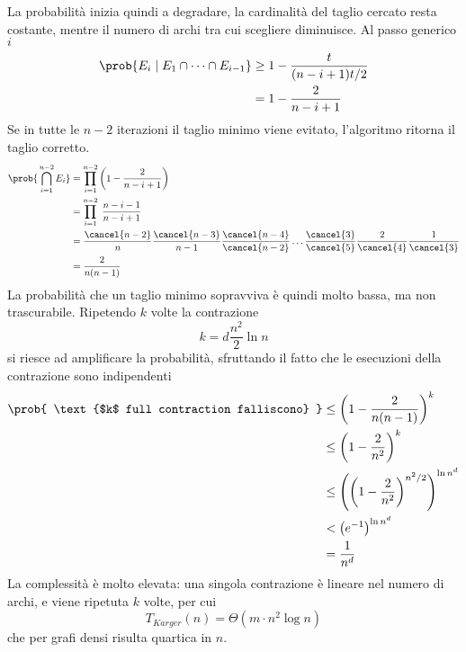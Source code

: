 La probabilità inizia quindi a degradare, la cardinalità del taglio cercato resta costante, mentre il numero di archi tra cui scegliere diminuisce. Al passo generico $i$
\begin{align*}
    \prob{
        E_i \mid
        E_1 \cap \cdots \cap E_{i-1}
    }
    &
    \geq
    1 - 
    \frac{t}{(n-i+1)t/2}
    \\
    &= 
    1 - 
    \frac{2}{n-i+1}
\end{align*}
Se in tutte le $n-2$ iterazioni il taglio minimo viene evitato, l'algoritmo ritorna il taglio corretto.
\begin{align*}
    \prob{
        \,
        \bigcap_{i=1}^{n-2} E_i
    }
    &= 
    \prod_{i=1}^{n-2}
    \left( 
        1 - 
        \frac{2}{n-i+1}
    \right)
    \\
    &= 
    \prod_{i=1}^{n-2}
    \;
    \frac{
        n-i-1
    }{
        n-i+1
    }
    \\
    &= 
    \frac{
        \cancel{
            n-2
        }
    }{
        n
    }
    \frac{
        \cancel{
            n-3
        }
    }{
        n-1
    }
    \frac{
        \cancel{
            n-4
        }
    }{
        \cancel{
            n-2
        }
    }
    \ldots
    \frac{
        \cancel{
            3
        }
    }{
        \cancel{
            5
        }
    }
    \frac{
        2
    }{
        \cancel{
            4
        }
    }
    \frac{
        1
    }{
        \cancel{
            3
        }
    }
    \\
    &= 
    \frac{2}{n(n-1)}
\end{align*}
La probabilità che un taglio minimo sopravviva è quindi molto bassa, ma non trascurabile.
Ripetendo $k$ volte la contrazione
\begin{equation*}
    k = d \frac{n^2}{2} \ln n
\end{equation*}
si riesce ad amplificare la probabilità, sfruttando il fatto che le esecuzioni della contrazione sono indipendenti
\begin{align*}
    \prob{
        \text{$k$ full contraction falliscono}
    }
    &
    \leq
    \left( 
        1 -
        \frac{2}{n(n-1)}
    \right)^k
    \\
    &
    \leq
    \left( 
        1 -
        \frac{2}{n^2}
    \right)^k
    \\
    &
    \leq
    \left( 
        \left( 
            1 -
            \frac{2}{n^2}
        \right)^{n^2/2}
    \right)^{\ln n^d}
    \\
    &
    <
    \left( e^{-1} \right)^{\ln n^d}
    \\
    &= 
    \frac{1}{n^d}
\end{align*}
La complessità è molto elevata: una singola contrazione è lineare nel numero di archi, e viene ripetuta $k$ volte, per cui
\begin{equation*}
    T_{Karger} (n) =
    \Theta \left( 
        m \cdot n^2 \log n
    \right)
\end{equation*}
che per grafi densi risulta quartica in $n$.

